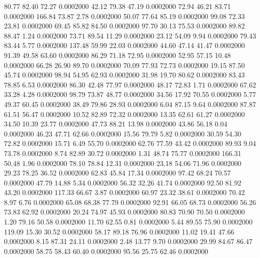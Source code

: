   80.77   82.40   72.27   0.0002000
  42.12   79.38   47.19   0.0002000
  72.94   46.21   83.71   0.0002000
 166.84   73.87    2.78   0.0002000
  50.07   77.64   85.19   0.0002000
  99.08   72.33   23.81   0.0002000
  69.45   85.82   84.50   0.0002000
  97.70   30.13   75.53   0.0002000
  89.82   88.47    1.24   0.0002000
  73.71   89.54   11.29   0.0002000
  23.12   54.09    9.94   0.0002000
  79.43   83.44    5.77   0.0002000
 137.48   59.99   22.03   0.0002000
  44.60   47.14   41.47   0.0002000
  91.39   49.58   63.60   0.0002000
  86.29   71.18   72.95   0.0002000
  52.95   57.15   10.48   0.0002000
  66.28   26.90   89.70   0.0002000
  70.09   77.93   72.73   0.0002000
  19.15   87.50   45.74   0.0002000
  98.94   54.95   62.93   0.0002000
  31.98   19.70   80.62   0.0002000
  83.43   78.85    6.53   0.0002000
  86.30   42.48   77.97   0.0002000
  48.17   72.83    1.71   0.0002000
  67.62   33.28    4.28   0.0002000
  98.79   73.87   48.77   0.0002000
  34.56   17.92   70.55   0.0002000
   5.77   49.37   60.45   0.0002000
  38.49   79.86   28.93   0.0002000
   6.04   87.15    9.64   0.0002000
  87.87   61.51   56.47   0.0002000
  10.52   82.89   72.32   0.0002000
  13.35   62.61   61.27   0.0002000
  34.50   10.39   23.77   0.0002000
  47.73   88.21   13.98   0.0002000
  43.86   56.18    0.04   0.0002000
  46.23   47.71   62.66   0.0002000
  15.56   79.79    5.82   0.0002000
  30.59   54.30   72.82   0.0002000
  15.71    6.49   55.70   0.0002000
  62.76   77.59   43.42   0.0002000
  89.93    9.04   73.78   0.0002000
   8.74   82.89   30.72   0.0002000
   1.31   48.74   75.77   0.0002000
 166.31   50.48    1.96   0.0002000
  78.10   78.84   12.31   0.0002000
  23.18   54.06   71.96   0.0002000
  29.23   78.25   36.52   0.0002000
  62.83   45.84   17.34   0.0002000
  97.42   68.24   70.57   0.0002000
  47.79   14.88    5.34   0.0002000
  56.32   32.26   41.74   0.0002000
  92.50   81.92   43.20   0.0002000
 117.33   66.67    3.87   0.0002000
  60.97   23.32   38.61   0.0002000
  70.42    8.97    6.76   0.0002000
  65.08   68.38   77.79   0.0002000
  92.91   66.05   68.73   0.0002000
  56.26   73.83   62.92   0.0002000
  20.24   74.97   45.93   0.0002000
  80.83   70.90   70.50   0.0002000
   1.20   79.16   50.58   0.0002000
  11.70   62.55    0.81   0.0002000
   5.44   89.55   75.90   0.0002000
 119.09   15.30   30.52   0.0002000
  58.17   89.18   76.96   0.0002000
  11.02   19.41   47.66   0.0002000
   8.15   87.31   24.11   0.0002000
   2.48   13.77    9.70   0.0002000
  29.99   84.67   86.47   0.0002000
  58.75   58.43   60.40   0.0002000
  95.56   25.75   62.46   0.0002000
